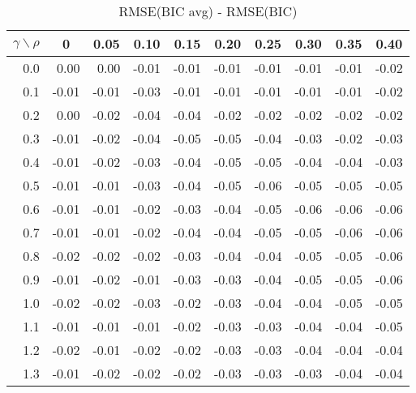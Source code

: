 \documentclass[12pt]{article}
\begin{document}
%
\begin{table}[!tbp]
 \begin{center}
\caption{RMSE(BIC avg) - RMSE(BIC)}
 \begin{tabular}{r|rrrrrrrrr}\hline\hline
\multicolumn{1}{c|}{$\gamma\backslash\rho$}&\multicolumn{1}{c}{0}&\multicolumn{1}{c}{0.05}&\multicolumn{1}{c}{0.10}&\multicolumn{1}{c}{0.15}&\multicolumn{1}{c}{0.20}&\multicolumn{1}{c}{0.25}&\multicolumn{1}{c}{0.30}&\multicolumn{1}{c}{0.35}&\multicolumn{1}{c}{0.40}\tabularnewline
\hline
0.0& 0.00& 0.00&-0.01&-0.01&-0.01&-0.01&-0.01&-0.01&-0.02\tabularnewline
0.1&-0.01&-0.01&-0.03&-0.01&-0.01&-0.01&-0.01&-0.01&-0.02\tabularnewline
0.2& 0.00&-0.02&-0.04&-0.04&-0.02&-0.02&-0.02&-0.02&-0.02\tabularnewline
0.3&-0.01&-0.02&-0.04&-0.05&-0.05&-0.04&-0.03&-0.02&-0.03\tabularnewline
0.4&-0.01&-0.02&-0.03&-0.04&-0.05&-0.05&-0.04&-0.04&-0.03\tabularnewline
0.5&-0.01&-0.01&-0.03&-0.04&-0.05&-0.06&-0.05&-0.05&-0.05\tabularnewline
0.6&-0.01&-0.01&-0.02&-0.03&-0.04&-0.05&-0.06&-0.06&-0.06\tabularnewline
0.7&-0.01&-0.01&-0.02&-0.04&-0.04&-0.05&-0.05&-0.06&-0.06\tabularnewline
0.8&-0.02&-0.02&-0.02&-0.03&-0.04&-0.04&-0.05&-0.05&-0.06\tabularnewline
0.9&-0.01&-0.02&-0.01&-0.03&-0.03&-0.04&-0.05&-0.05&-0.06\tabularnewline
1.0&-0.02&-0.02&-0.03&-0.02&-0.03&-0.04&-0.04&-0.05&-0.05\tabularnewline
1.1&-0.01&-0.01&-0.01&-0.02&-0.03&-0.03&-0.04&-0.04&-0.05\tabularnewline
1.2&-0.02&-0.01&-0.02&-0.02&-0.03&-0.03&-0.04&-0.04&-0.04\tabularnewline
1.3&-0.01&-0.02&-0.02&-0.02&-0.03&-0.03&-0.03&-0.04&-0.04\tabularnewline
\hline
\end{tabular}

\end{center}

\end{table}
\end{document}
